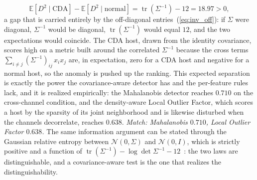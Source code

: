 \documentclass[journal]{IEEEtran}
\begin{document}
\begin{equation}
\label{eq:maha_gap}
\mathbb{E}\!\left[D^2 \mid \text{CDA}\right] - \mathbb{E}\!\left[D^2 \mid \text{normal}\right]
 = \operatorname{tr}(\Sigma^{-1}) - 12 = 18.97 > 0,
\end{equation}
a gap that is carried entirely by the off-diagonal entries~(\ref{eq:inv_off}): if $\Sigma$ were
diagonal, $\Sigma^{-1}$ would be diagonal, $\operatorname{tr}(\Sigma^{-1})$ would equal $12$, and the
two expectations would coincide. The CDA host, drawn from the identity covariance, scores high on a
metric built around the correlated $\Sigma^{-1}$ because the cross terms $\sum_{i \neq j}
(\Sigma^{-1})_{ij}\, x_i x_j$ are, in expectation, zero for a CDA host and negative for a normal host,
so the anomaly is pushed up the ranking. This expected separation is exactly the power the
covariance-aware detector has and the per-feature rules lack, and it is realized empirically: the
Mahalanobis detector reaches $0.710$ on the cross-channel condition, and the density-aware Local
Outlier Factor, which scores a host by the sparsity of its joint neighborhood and is likewise
disturbed when the channels decorrelate, reaches $0.638$. \emph{Match: Mahalanobis $0.710$, Local
Outlier Factor $0.638$.} The same information argument can be stated through the Gaussian relative
entropy between $\mathcal{N}(0, \Sigma)$ and $\mathcal{N}(0, I)$, which is strictly positive and a
function of $\operatorname{tr}(\Sigma^{-1}) - \log\det\Sigma^{-1} - 12$~\cite{cover2006elements}: the
two laws are distinguishable, and a covariance-aware test is the one that realizes the
distinguishability.
\end{document}
